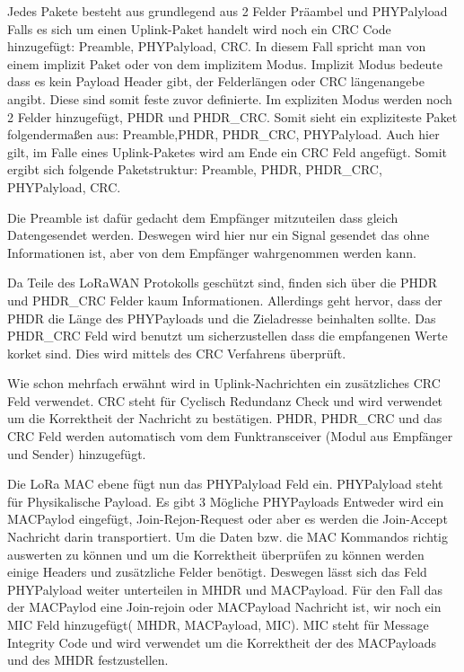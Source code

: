 \documentclass[a4paper,12pt]{article}
\begin{document}
                Jedes Pakete besteht aus grundlegend aus 2 Felder Präambel und  PHYPalyload Falls es sich um einen 
                Uplink-Paket handelt wird noch ein CRC Code hinzugefügt: Preamble, PHYPalyload, CRC. 
                In diesem Fall spricht man von einem implizit Paket oder von dem implizitem Modus. Implizit Modus bedeute 
                dass es kein Payload Header gibt, der Felderlängen oder CRC längenangebe angibt. Diese sind somit feste 
                zuvor definierte. Im expliziten Modus werden noch 2 Felder hinzugefügt, PHDR und PHDR\_CRC. Somit sieht 
                ein expliziteste Paket folgendermaßen aus:  Preamble,PHDR, PHDR\_CRC, PHYPalyload. Auch hier gilt, im Falle
                eines Uplink-Paketes wird am Ende ein CRC Feld angefügt. Somit ergibt sich folgende Paketstruktur: 
                Preamble, PHDR, PHDR\_CRC, PHYPalyload, CRC.

                Die Preamble ist dafür gedacht dem Empfänger mitzuteilen dass gleich Datengesendet werden. Deswegen wird 
                hier nur ein Signal gesendet das ohne Informationen ist, aber von dem Empfänger wahrgenommen werden kann.

                Da Teile des LoRaWAN Protokolls geschützt sind, finden sich über die PHDR und PHDR\_CRC Felder kaum 
                Informationen. Allerdings geht hervor, dass der PHDR die Länge des PHYPayloads und die Zieladresse 
                beinhalten sollte.
                Das PHDR\_CRC Feld wird benutzt um sicherzustellen dass die empfangenen Werte korket sind. Dies wird  
                mittels des CRC Verfahrens überprüft.
                
                Wie schon mehrfach erwähnt wird in Uplink-Nachrichten ein zusätzliches CRC Feld verwendet. CRC steht für 
                Cyclisch Redundanz Check und wird verwendet um die Korrektheit der Nachricht zu bestätigen. PHDR, PHDR\_CRC 
                und das CRC Feld werden automatisch vom dem Funktransceiver (Modul aus Empfänger und Sender) hinzugefügt.

                Die LoRa MAC ebene fügt nun das PHYPalyload Feld ein. PHYPalyload steht für Physikalische Payload. Es gibt 
                3 Mögliche PHYPayloads Entweder wird ein MACPaylod eingefügt, Join-Rejon-Request oder aber es werden die Join-Accept Nachricht darin transportiert. Um die Daten bzw. die MAC Kommandos richtig auswerten zu können und um die Korrektheit überprüfen zu können werden einige Headers und zusätzliche Felder benötigt. Deswegen lässt sich das Feld PHYPalyload weiter unterteilen in MHDR und MACPayload. Für den Fall das der MACPaylod eine Join-rejoin oder MACPayload Nachricht ist, wir noch ein MIC Feld hinzugefügt( MHDR, MACPayload, MIC). MIC steht für Message Integrity Code und wird verwendet um die Korrektheit der des MACPayloads und des MHDR festzustellen.
\end{document}

